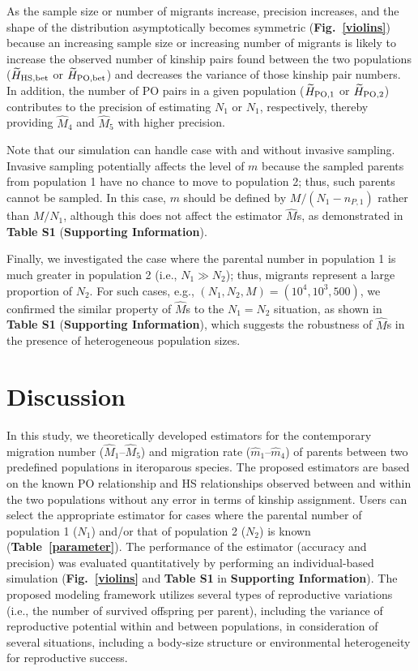 \documentclass[12pt, English]{article}
\begin{document}
\begin{spacing}{1.9}
As the sample size or number of migrants increase, precision increases, and the shape of the distribution asymptotically becomes symmetric ({\bf Fig.~\ref{violins}}) because an increasing sample size or increasing number of migrants is likely to increase the observed number of kinship pairs found between the two populations ($\widetilde{H}_{\rm HS,bet}$ or $\widetilde{H}_{\rm PO,bet}$) and decreases the variance of those kinship pair numbers. In addition, the number of PO pairs in a given population ($\widetilde{H}_{\rm PO,1}$ or $\widetilde{H}_{\rm PO,2}$) contributes to the precision of estimating $N_1$ or $N_1$, respectively, thereby providing ${\hat M_4}$ and ${\hat M_5}$ with higher precision. 

Note that our simulation can handle case with and without invasive sampling. Invasive sampling potentially affects the level of $m$ because the sampled parents from population 1 have no chance to move to population 2; thus, such parents cannot be sampled. In this case, $m$ should be defined by $M/(N_1-n_{P,1})$ rather than $M/N_1$, although this does not affect the estimator ${\hat M}$s, as demonstrated in {\bf Table S1} ({\bf Supporting Information}). 

Finally, we investigated the case where the parental number in population 1 is much greater in population 2 (i.e., $N_1 \gg N_2$); thus, migrants represent a  large proportion of $N_2$. For such cases, e.g., $(N_1,N_2,M)=(10^4,10^3,500)$, we confirmed the similar property of ${\hat M}$s to the $N_1 = N_2$ situation, as shown in {\bf Table S1} ({\bf Supporting Information}), which suggests the robustness of ${\hat M}$s in the presence of heterogeneous population sizes.   

\section{Discussion}\label{sec4}

In this study, we theoretically developed estimators for the contemporary migration number (${\hat M_1}$--${\hat M_5}$) and migration rate (${\hat m_1}$--${\hat m_4}$) of parents between two predefined populations in iteroparous species. The proposed estimators are based on the known PO relationship and HS relationships observed between and within the two populations without any error in terms of kinship assignment. Users can select the appropriate estimator for cases where the parental number of population 1 ($N_1$) and/or that of population 2 ($N_2$) is known ({\bf Table~\ref{parameter}}). The performance of the estimator (accuracy and precision) was evaluated quantitatively by performing an individual-based simulation ({\bf Fig.~\ref{violins}} and {\bf Table S1} in {\bf Supporting Information}). The proposed modeling framework utilizes several types of reproductive variations (i.e., the number of survived offspring per parent), including the variance of reproductive potential within and between populations, in consideration of several situations, including a body-size structure or environmental heterogeneity for reproductive success.


\end{spacing}
\end{document}
